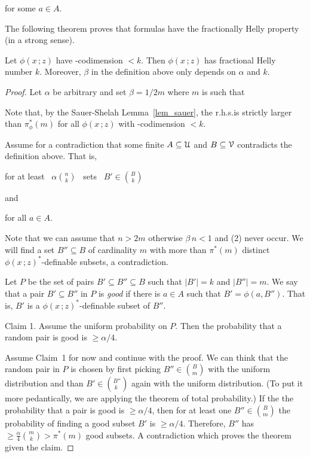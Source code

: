 \documentclass[scombinatorics.tex]{subfiles}
\begin{document}
\hfill for some $a\in A$.

The following theorem proves that \nip{} formulas have the fractionally Helly property (in a strong sense).

\begin{theorem}[(Matou\v{s}ek)]\label{thm_matousek}
Let  $\phi(x\,;z)$ have \vc-codimension $<k$.
Then $\phi(x\,;z)$ has fractional Helly number $k$.
Moreover, $\beta$ in the definition above only depends on $\alpha$ and $k$.
\end{theorem}

\begin{proof}
Let $\alpha$ be arbitrary and set $\beta=1/2m$ where $m$ is such that 


Note that, by the Sauer-Shelah Lemma~\ref{lem_sauer}, the r.h.s.\@ is strictly larger than $\pi^*_\phi(m)$ for all $\phi(x\,;z)$ with \vc-codimension $<k$.

Assume for a contradiction that some finite $A\subseteq\EuScript U$ and $B\subseteq\EuScript V$ contradicts the definition above.
That is,
 
\hfill for at least \ $\displaystyle\alpha{n\choose k}$ \ sets \ $\displaystyle B'\in{B\choose k}$

and

\hfill for all $a\in A$.

Note that we can assume that $n>2m$ otherwise $\beta\,n<1$ and (2) never occur.
We will find a set $B''\subseteq B$ of cardinality $m$ with more than $\pi^*(m)$ distinct $\phi(x\,;z)^*$-definable subsets, a contradiction.

Let $P$ be the set of pairs $B'\subseteq B''\subseteq B$ such that $|B'|=k$ and $|B''|=m$.
We say that a pair $B'\subseteq B''$ in $P$ is \textit{good\/} if there is $a\in A$ such that $B'=\phi(a,B'')$.
That is, $B'$ is a $\phi(x\,;z)^*$-definable subset of $B''$.

Claim 1. 
Assume the uniform probability on $P$.
Then the probability that a random pair is good is $\ge\alpha/4$.

Assume Claim~1 for now and continue with the proof.
We can think that the random pair in $P$ is chosen by first picking $B''\in{B\choose m}$ with the uniform distribution and than $B'\in{B''\choose k\phantom{'}}$ again with the uniform distribution. 
(To put it more pedantically, we are applying the theorem of total probability.)
If the the probability that a pair is good is $\ge\alpha/4$, then for at least one $B''\in{B\choose m}$ the probability of finding a good subset $B'$ is $\ge\alpha/4$.
Therefore, $B''$ has $\ge\frac\alpha4{m\choose k}>\pi^*(m)$ good subsets.
A contradiction which proves the theorem given the claim.


\end{proof}
\end{document}
